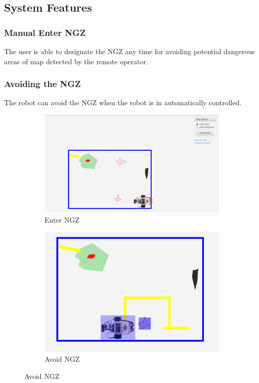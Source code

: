 \documentclass[10pt,a4paper,titlepage]{article}
\begin{document}
 
 
  \subsection{System Features} 
   
  \subsubsection{Manual Enter NGZ} 
  The user is able to designate the NGZ any time for avoiding potential dangerous areas of map detected by the remote operator. 
 
  \subsubsection{Avoiding the NGZ} 
The robot can avoid the NGZ when the robot is in automatically controlled. 

\begin{figure}[H]
	\centering
	\begin{subfigure}[t]{0.45\textwidth}
		\includegraphics[width=0.95\linewidth]{enterngz.png}  
  \caption{Enter NGZ} 
\label{fig:Enter NGZ}                
	\end{subfigure}
	\begin{subfigure}[t]{0.45\textwidth}
		\includegraphics[width=0.95\linewidth]{avoidngz.png}  
  \caption{Avoid NGZ} 
\label{fig:Avoid NGZ}               
	\end{subfigure}
\end{figure}
\end{document}

